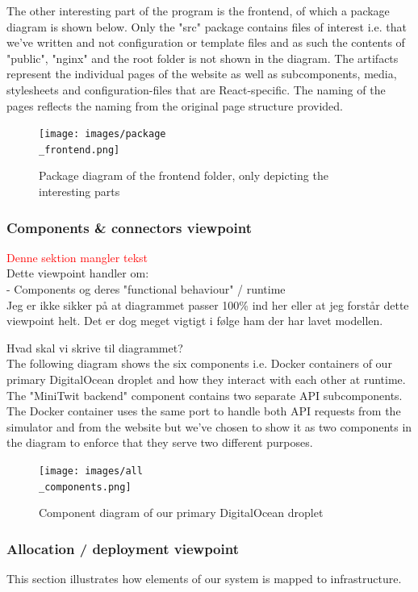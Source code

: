 \newpage
The other interesting part of the program is the frontend, of which a package diagram is shown below.
Only the "src" package contains files of interest i.e. that we've written and not configuration or template files and as such the contents of "public", "nginx" and the root folder is not shown in the diagram. The artifacts represent the individual pages of the website as well as subcomponents, media, stylesheets and configuration-files that are React-specific. The naming of the pages reflects the naming from the original page structure provided.

\begin{figure}[H]
 \centering
 \texttt{[image: images/package\\\_frontend.png]}
 \caption{Package diagram of the frontend folder, only depicting the interesting parts}
 \label{fig:FrontendPackageDiagram}
\end{figure}


\subsubsection{Components \& connectors viewpoint}
\textcolor{red}{Denne sektion mangler tekst}\\
Dette viewpoint handler om: \\
- Components og deres "functional behaviour" / runtime \\
Jeg er ikke sikker på at diagrammet passer 100\% ind her eller at jeg forstår dette viewpoint helt. Det er dog meget vigtigt i følge ham der har lavet modellen. 


Hvad skal vi skrive til diagrammet? \\


The following diagram shows the six components i.e. Docker containers of our primary DigitalOcean droplet and how they interact with each other at runtime. The "MiniTwit backend" component contains two separate API subcomponents. The Docker container uses the same port to handle both API requests from the simulator and from the website but we've chosen to show it as two components in the diagram to enforce that they serve two different purposes.
\begin{figure}[H]
 \centering
 \texttt{[image: images/all\\\_components.png]}
 \caption{Component diagram of our primary DigitalOcean droplet}
 \label{fig:CompleteComponentDiagram}
\end{figure}


\subsubsection{Allocation / deployment viewpoint}
This section illustrates how elements of our system is mapped to infrastructure.


